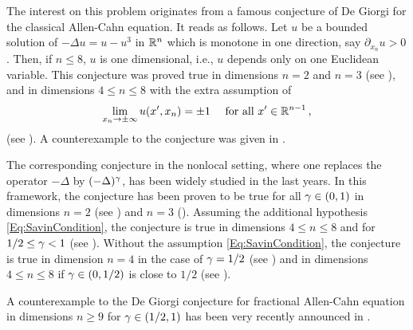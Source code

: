 The interest on this problem originates from a famous conjecture of De Giorgi for the classical Allen-Cahn equation. It reads as follows. Let $u$ be a bounded solution of $-\Delta  u = u - u^3$ in $\mathbb{R}^n$ which is monotone in one direction, say $\partial_{x_n} u > 0$. Then, if $n\leq 8$, $u$ is one dimensional, i.e., $u$ depends only on one Euclidean variable. This conjecture was proved true in dimensions $n=2$ and  $n=3$ (see \cite{GhoussoubGui,AmbrosioCabre}), and in dimensions $4\leq n \leq 8$ with the extra assumption of
\begin{equation}
\label{Eq:SavinCondition}
\lim_{x_n \to \pm \infty} u(x',x_n) = \pm 1 \quad \text{ for all } x'\in \mathbb{R}^{n-1}\,,
\end{equation}
(see \cite{Savin-DeGiorgi}). A counterexample to the conjecture was given in \cite{delPinoKowalczykWei}. 


The corresponding conjecture in the nonlocal setting, where one replaces the operator $-\Delta$ by $(-\Delta)^\gamma$, has been widely studied in the last years. In this framework, the conjecture has been proven to be true for all $\gamma \in (0,1)$ in dimensions $n=2$  (see \cite{CabreSolaMorales, CabreSireI,SireValdinoci}) and $n=3$  (\cite{CabreCinti-EnergyHalfL, CabreCinti-SharpEnergy,DipierroSerraValdinoci}). Assuming the additional hypothesis \eqref{Eq:SavinCondition}, the conjecture is true in dimensions $4\leq n \leq 8$ and for $1/2 \leq \gamma < 1$ (see \cite{Savin-Fractional,Savin-Fractional2}). Without the assumption \eqref{Eq:SavinCondition}, the conjecture is true in dimension $n=4$ in the case of $\gamma = 1/2$ (see \cite{FigalliSerra}) and in dimensions $4\leq n \leq 8$ if $\gamma\in(0,1/2)$ is close to $1/2$ (see \cite{DipierroSerraValdinoci}).

 A counterexample to the De Giorgi conjecture for fractional Allen-Cahn equation in dimensions $n \geq 9$ for $\gamma \in (1/2,1)$ has been very recently announced in \cite{ChanLiuWei}.



